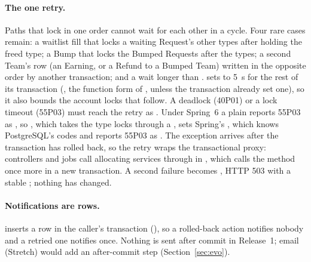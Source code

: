 \paragraph{The one retry.} Paths that lock in one order cannot wait for each other in a cycle. Four rare cases remain: a waitlist fill that locks a waiting Request's other types after holding the freed type; a Bump that locks the Bumped Requests after the types; a second Team's  row (an Earning, or a Refund to a Bumped Team) written in the opposite order by another transaction; and a wait longer than .  sets  to 5~s for the rest of its transaction (, the function form of , unless the transaction already set one), so it also bounds the account locks that follow. A deadlock (40P01) or a lock timeout (55P03) must reach the retry as . Under Spring~6 a plain  reports 55P03 as , so , which takes the type locks through a , sets Spring's , which knows PostgreSQL's codes and reports 55P03 as . The exception arrives after the transaction has rolled back, so the retry wraps the transactional proxy: controllers and jobs call allocating services through  in , which calls the method once more in a new transaction. A second failure becomes , HTTP 503 with a stable ; nothing has changed.

\paragraph{Notifications are rows.}  inserts a  row in the caller's transaction (), so a rolled-back action notifies nobody and a retried one notifies once. Nothing is sent after commit in Release~1; email (Stretch) would add an after-commit step (Section~\ref{sec:evo}).

